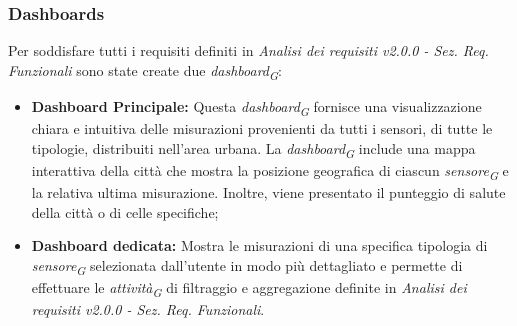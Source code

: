\subsubsection{Dashboards}
Per soddisfare tutti i requisiti definiti in \textit{Analisi dei requisiti v2.0.0 - Sez. Req. Funzionali} sono state create due \textit{dashboard}\textsubscript{\textit{G}}:
\begin{itemize}
    \item \textbf{Dashboard Principale:} Questa \textit{dashboard}\textsubscript{\textit{G}} fornisce una visualizzazione chiara e intuitiva delle misurazioni provenienti da tutti i sensori, di tutte le tipologie, distribuiti nell'area urbana. La \textit{dashboard}\textsubscript{\textit{G}} include una mappa interattiva della città che mostra la posizione geografica di ciascun \textit{sensore}\textsubscript{\textit{G}} e la relativa ultima misurazione. Inoltre, viene presentato il punteggio di salute della città o di celle specifiche;
    \item \textbf{Dashboard dedicata:} Mostra le misurazioni di una specifica tipologia di \textit{sensore}\textsubscript{\textit{G}} selezionata dall'utente in modo più dettagliato e permette di effettuare le \textit{attività}\textsubscript{\textit{G}} di filtraggio e aggregazione definite in \textit{Analisi dei requisiti v2.0.0 - Sez. Req. Funzionali}.
\end{itemize}



